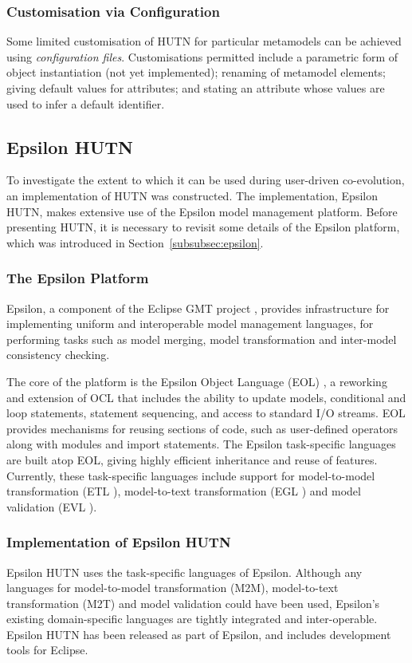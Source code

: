 \subsubsection{Customisation via Configuration}
Some limited customisation of HUTN for particular metamodels can be achieved using \emph{configuration files}. Customisations permitted include a parametric form of object instantiation (not yet implemented); renaming of metamodel elements; giving default values for attributes; and stating an attribute whose values are used to infer a default identifier.


\subsection{Epsilon HUTN}
To investigate the extent to which it can be used during user-driven co-evolution, an implementation of HUTN was constructed. The implementation, Epsilon HUTN, makes extensive use of the Epsilon model management platform. Before presenting HUTN, it is necessary to revisit some details of the Epsilon \cite{kolovos09thesis} platform, which was introduced in Section~\ref{subsubsec:epsilon}.

\subsubsection{The Epsilon Platform}
Epsilon, a component of the Eclipse GMT project \cite{gmt}, provides infrastructure for implementing uniform and interoperable model management languages, for performing tasks such as model merging, model transformation and inter-model consistency checking. 

The core of the platform is the Epsilon Object Language (EOL) \cite{kolovos06eol}, a reworking and extension of OCL that includes the ability to update models, conditional and loop statements, statement sequencing, and access to standard I/O streams. EOL provides mechanisms for reusing sections of code, such as user-defined operators along with modules and import statements. The Epsilon task-specific languages are built atop EOL, giving highly efficient inheritance and reuse of features. Currently, these task-specific languages include support for model-to-model transformation (ETL \cite{kolovos08etl}), model-to-text transformation (EGL \cite{rose08egl}) and model validation (EVL \cite{kolovos08evl}).


\subsubsection{Implementation of Epsilon HUTN}
Epsilon HUTN uses the task-specific languages of Epsilon. Although any languages for model-to-model transformation 
(M2M), model-to-text transformation (M2T) and model validation could have been used, Epsilon's existing domain-specific languages are tightly integrated and inter-operable. Epsilon HUTN has been released as part of Epsilon, and includes development tools for Eclipse.

